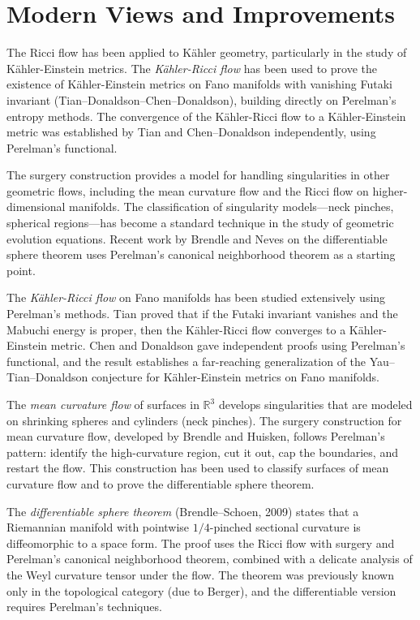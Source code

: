 \section{Modern Views and Improvements}

The Ricci flow has been applied to K\"ahler geometry, particularly in the study of K\"ahler-Einstein metrics. The \emph{K\"ahler-Ricci flow} has been used to prove the existence of K\"ahler-Einstein metrics on Fano manifolds with vanishing Futaki invariant (Tian--Donaldson--Chen--Donaldson), building directly on Perelman's entropy methods. The convergence of the K\"ahler-Ricci flow to a K\"ahler-Einstein metric was established by Tian and Chen--Donaldson independently, using Perelman's functional.

The surgery construction provides a model for handling singularities in other geometric flows, including the mean curvature flow and the Ricci flow on higher-dimensional manifolds. The classification of singularity models---neck pinches, spherical regions---has become a standard technique in the study of geometric evolution equations. Recent work by Brendle and Neves on the differentiable sphere theorem uses Perelman's canonical neighborhood theorem as a starting point.

The \emph{K\"ahler-Ricci flow} on Fano manifolds has been studied extensively using Perelman's methods. Tian proved that if the Futaki invariant vanishes and the Mabuchi energy is proper, then the K\"ahler-Ricci flow converges to a K\"ahler-Einstein metric. Chen and Donaldson gave independent proofs using Perelman's functional, and the result establishes a far-reaching generalization of the Yau--Tian--Donaldson conjecture for K\"ahler-Einstein metrics on Fano manifolds.

The \emph{mean curvature flow} of surfaces in $\mathbb{R}^3$ develops singularities that are modeled on shrinking spheres and cylinders (neck pinches). The surgery construction for mean curvature flow, developed by Brendle and Huisken, follows Perelman's pattern: identify the high-curvature region, cut it out, cap the boundaries, and restart the flow. This construction has been used to classify surfaces of mean curvature flow and to prove the differentiable sphere theorem.

The \emph{differentiable sphere theorem} (Brendle--Schoen, 2009) states that a Riemannian manifold with pointwise $1/4$-pinched sectional curvature is diffeomorphic to a space form. The proof uses the Ricci flow with surgery and Perelman's canonical neighborhood theorem, combined with a delicate analysis of the Weyl curvature tensor under the flow. The theorem was previously known only in the topological category (due to Berger), and the differentiable version requires Perelman's techniques.

